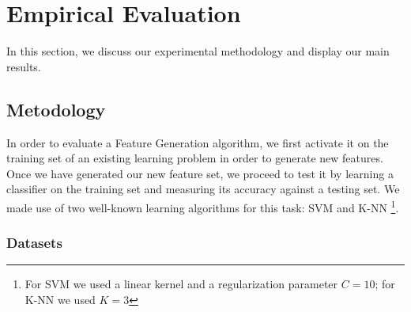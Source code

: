 \documentclass[twoside,11pt]{article}
\theoremstyle{definition}
\begin{document}

\section{Empirical Evaluation}
In this section, we discuss our experimental methodology and display our main results.

\subsection{Metodology}

In order to evaluate a Feature Generation algorithm, we first activate it on the training set of an existing learning problem in order to generate new features. Once we have generated our new feature set, we proceed to test it by learning a classifier on the training set and measuring its accuracy against a testing set. We made use of two well-known learning algorithms for this task: SVM \cite{cortes1995support} and K-NN \cite{fix1951discriminatory}\footnote{For SVM we used a linear kernel and a regularization parameter $C=10$; for K-NN we used $K=3$}.

\subsubsection{Datasets}
\end{document}
